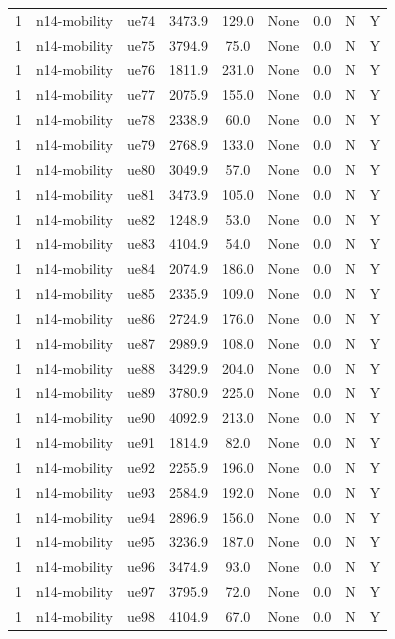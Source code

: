 \begin{table}[ht]
\begin{tabular}{|c|c|c|c|c|c|c|c|c|}
1 & n14-mobility & ue74 & 3473.9 & 129.0 & None & 0.0 & N & Y \\
1 & n14-mobility & ue75 & 3794.9 & 75.0 & None & 0.0 & N & Y \\
1 & n14-mobility & ue76 & 1811.9 & 231.0 & None & 0.0 & N & Y \\
1 & n14-mobility & ue77 & 2075.9 & 155.0 & None & 0.0 & N & Y \\
1 & n14-mobility & ue78 & 2338.9 & 60.0 & None & 0.0 & N & Y \\
1 & n14-mobility & ue79 & 2768.9 & 133.0 & None & 0.0 & N & Y \\
1 & n14-mobility & ue80 & 3049.9 & 57.0 & None & 0.0 & N & Y \\
1 & n14-mobility & ue81 & 3473.9 & 105.0 & None & 0.0 & N & Y \\
1 & n14-mobility & ue82 & 1248.9 & 53.0 & None & 0.0 & N & Y \\
1 & n14-mobility & ue83 & 4104.9 & 54.0 & None & 0.0 & N & Y \\
1 & n14-mobility & ue84 & 2074.9 & 186.0 & None & 0.0 & N & Y \\
1 & n14-mobility & ue85 & 2335.9 & 109.0 & None & 0.0 & N & Y \\
1 & n14-mobility & ue86 & 2724.9 & 176.0 & None & 0.0 & N & Y \\
1 & n14-mobility & ue87 & 2989.9 & 108.0 & None & 0.0 & N & Y \\
1 & n14-mobility & ue88 & 3429.9 & 204.0 & None & 0.0 & N & Y \\
1 & n14-mobility & ue89 & 3780.9 & 225.0 & None & 0.0 & N & Y \\
1 & n14-mobility & ue90 & 4092.9 & 213.0 & None & 0.0 & N & Y \\
1 & n14-mobility & ue91 & 1814.9 & 82.0 & None & 0.0 & N & Y \\
1 & n14-mobility & ue92 & 2255.9 & 196.0 & None & 0.0 & N & Y \\
1 & n14-mobility & ue93 & 2584.9 & 192.0 & None & 0.0 & N & Y \\
1 & n14-mobility & ue94 & 2896.9 & 156.0 & None & 0.0 & N & Y \\
1 & n14-mobility & ue95 & 3236.9 & 187.0 & None & 0.0 & N & Y \\
1 & n14-mobility & ue96 & 3474.9 & 93.0 & None & 0.0 & N & Y \\
1 & n14-mobility & ue97 & 3795.9 & 72.0 & None & 0.0 & N & Y \\
1 & n14-mobility & ue98 & 4104.9 & 67.0 & None & 0.0 & N & Y \\

\end{tabular}
\end{table}
